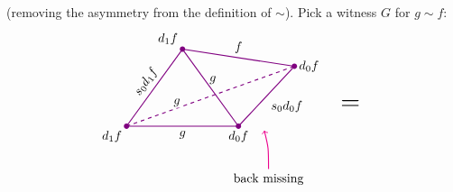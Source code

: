         (removing the asymmetry from the definition of $\sim$). Pick a witness $G$ for $g \sim f$:
        \begin{equation*}
            \begin{tikzpicture}[
                scale=1.2,
                thick,
                color=violet, %
                every node/.style={text=black},
                dot/.style={circle, fill=violet, inner sep=1.5pt, outer sep=0pt}
            ]

    
                \coordinate (A) at (0,0);       %
                \coordinate (B) at (1.3, 1.8);  %
                \coordinate (C) at (2.6, 0);    %
                \coordinate (D) at (3.9, 1.4);  %

                \draw (A) -- node[sloped, above] {$s_0 d_1 f$} (B);
                \draw (A) -- node[below] {$g$} (C);
                \draw (B) -- node[right, pos=0.4] {$g$} (C);
                \draw (B) -- node[above] {$f$} (D);
                \draw (C) -- node[below right] {$s_0 d_0 f$} (D);
    
                \draw[dashed] (A) -- node[fill=white, inner sep=1pt, above, pos=0.3] {$g$} (D);

                \node[dot] at (A) {};
                \node[dot] at (B) {};
                \node[dot] at (C) {};
                \node[dot] at (D) {};

                \node[below left] at (A) {$d_1 f$};
                \node[above left] at (B) {$d_1 f$};
                \node[below] at (C) {$d_0 f$};
                \node[right] at (D) {$d_0 f$};

                \draw[->, magenta, thick] (3.3, -1.0) node[below] {back missing} .. controls (3.3, -0.5) .. (3.2, -0.1);


                \node[scale=2] at (5.2, 0.5) {=};



                \begin{scope}[shift={(6.0, 0.5)}]
                    \coordinate (T1_0) at (0,0);
                    \coordinate (T1_1) at (1.0, 1.8);
                    \coordinate (T1_2) at (2.3, 0);


\end{scope}
\end{tikzpicture}
\end{equation*}
